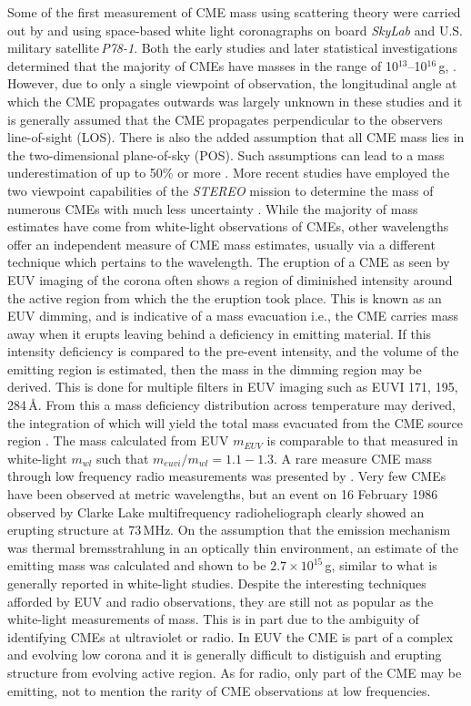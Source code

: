 Some of the first measurement of CME mass using scattering theory were carried out by \citet{munro1979} and \citet{poland1981} using space-based  white light coronagraphs on board \emph{SkyLab} and U.S. military satellite\,\emph{P78-1}.  Both the early studies and later statistical investigations determined that the majority of CMEs have masses in the range of 10$^{13}$--10$^{16}$\,g, \citep{vourlidas02, vour2010}. However, due to only a single viewpoint of observation, the longitudinal angle at which the CME propagates outwards was largely unknown in these studies and it is generally assumed that the CME propagates perpendicular to the observers line-of-sight (LOS). There is also the added assumption that all CME mass lies in the two-dimensional plane-of-sky (POS). Such assumptions can lead to a mass underestimation of up to 50\% or more \citep{vou00}. More recent studies have employed the two viewpoint capabilities of the \emph{STEREO} mission to determine the mass of numerous CMEs with much less uncertainty \citep{cola09}. While the majority of mass estimates have come from white-light observations of CMEs, other wavelengths offer an independent measure of CME mass estimates, usually via a different technique which pertains to the wavelength. The eruption of a CME as seen by EUV imaging of the corona often shows a region of diminished intensity around the active region from which the the eruption took place. This is known as an EUV dimming, and is indicative of a mass evacuation i.e., the CME carries mass away when it erupts leaving behind a deficiency in emitting material.  If this intensity deficiency is compared to the pre-event intensity, and the volume of the emitting region is estimated, then the mass in the dimming region may be derived. This is done for multiple filters in EUV imaging such as EUVI 171, 195, 284\,\AA. From this a mass deficiency distribution across temperature may derived, the integration of which will yield the total mass evacuated from the CME source region \citep{aschw09}. The mass calculated from EUV $m_{EUV}$ is comparable to that measured in white-light $m_{wl}$ such that $m_{euvi}/m_{wl}=1.1 -1.3$. A rare measure CME mass through low frequency radio measurements was presented by \citet{gopalswamy1992}. Very few CMEs have been observed at metric wavelengths, but an event on 16 February 1986 observed by Clarke Lake multifrequency radioheliograph clearly showed an erupting structure at 73\,MHz. On the assumption that the emission mechanism was thermal bremsstrahlung in an optically thin environment, an estimate of the emitting mass was calculated and shown to be $2.7\times10^{15}$\,g, similar to what is generally reported in white-light studies. Despite the interesting techniques afforded by EUV and radio observations, they are still not as popular as the white-light measurements of mass. This is in part due to the ambiguity of identifying CMEs at ultraviolet or radio. In EUV the CME is part of a complex and evolving low corona and it is generally difficult to distiguish and erupting structure from evolving active region. As for radio, only part of the CME may be emitting, not to mention the rarity of CME observations at low frequencies.

